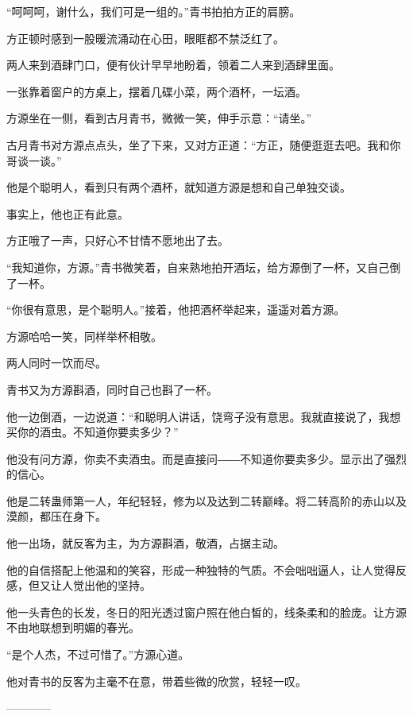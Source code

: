 \begin{this_body}
“呵呵呵，谢什么，我们可是一组的。”青书拍拍方正的肩膀。

方正顿时感到一股暖流涌动在心田，眼眶都不禁泛红了。

两人来到酒肆门口，便有伙计早早地盼着，领着二人来到酒肆里面。

一张靠着窗户的方桌上，摆着几碟小菜，两个酒杯，一坛酒。

方源坐在一侧，看到古月青书，微微一笑，伸手示意：“请坐。”

古月青书对方源点点头，坐了下来，又对方正道：“方正，随便逛逛去吧。我和你哥谈一谈。”

他是个聪明人，看到只有两个酒杯，就知道方源是想和自己单独交谈。

事实上，他也正有此意。

方正哦了一声，只好心不甘情不愿地出了去。

“我知道你，方源。”青书微笑着，自来熟地拍开酒坛，给方源倒了一杯，又自己倒了一杯。

“你很有意思，是个聪明人。”接着，他把酒杯举起来，遥遥对着方源。

方源哈哈一笑，同样举杯相敬。

两人同时一饮而尽。

青书又为方源斟酒，同时自己也斟了一杯。

他一边倒酒，一边说道：“和聪明人讲话，饶弯子没有意思。我就直接说了，我想买你的酒虫。不知道你要卖多少？”

他没有问方源，你卖不卖酒虫。而是直接问――不知道你要卖多少。显示出了强烈的信心。

他是二转蛊师第一人，年纪轻轻，修为以及达到二转巅峰。将二转高阶的赤山以及漠颜，都压在身下。

他一出场，就反客为主，为方源斟酒，敬酒，占据主动。

他的自信搭配上他温和的笑容，形成一种独特的气质。不会咄咄逼人，让人觉得反感，但又让人觉出他的坚持。

他一头青色的长发，冬日的阳光透过窗户照在他白皙的，线条柔和的脸庞。让方源不由地联想到明媚的春光。

“是个人杰，不过可惜了。”方源心道。

他对青书的反客为主毫不在意，带着些微的欣赏，轻轻一叹。

------------

\end{this_body}

